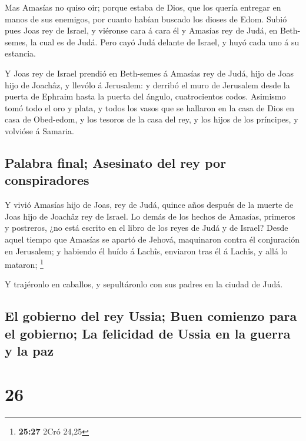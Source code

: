  Mas Amasías no quiso oir; porque estaba de Dios, que los
quería entregar en manos de sus enemigos, por cuanto habían buscado los
dioses de Edom.  Subió pues Joas rey de Israel, y viéronse
cara á cara él y Amasías rey de Judá, en Beth-semes, la cual es de Judá.
 Pero cayó Judá delante de Israel, y huyó cada uno á su
estancia.

 Y Joas rey de Israel prendió en Beth-semes á Amasías rey
de Judá, hijo de Joas hijo de Joachâz, y llevólo á Jerusalem: y derribó
el muro de Jerusalem desde la puerta de Ephraim hasta la puerta del
ángulo, cuatrocientos codos.  Asimismo tomó todo el oro y
plata, y todos los vasos que se hallaron en la casa de Dios en casa de
Obed-edom, y los tesoros de la casa del rey, y los hijos de los
príncipes, y volvióse á Samaria.

\hypertarget{palabra-final-asesinato-del-rey-por-conspiradores}{%
\subsection{Palabra final; Asesinato del rey por
conspiradores}\label{palabra-final-asesinato-del-rey-por-conspiradores}}

 Y vivió Amasías hijo de Joas, rey de Judá, quince años
después de la muerte de Joas hijo de Joachâz rey de Israel.
 Lo demás de los hechos de Amasías, primeros y postreros,
¿no está escrito en el libro de los reyes de Judá y de Israel?
 Desde aquel tiempo que Amasías se apartó de Jehová,
maquinaron contra él conjuración en Jerusalem; y habiendo él huído á
Lachîs, enviaron tras él á Lachîs, y allá lo mataron; \footnote{\textbf{25:27}
  2Cró 24,25}

 Y trajéronlo en caballos, y sepultáronlo con sus padres en
la ciudad de Judá.

\hypertarget{el-gobierno-del-rey-ussia-buen-comienzo-para-el-gobierno-la-felicidad-de-ussia-en-la-guerra-y-la-paz}{%
\subsection{El gobierno del rey Ussia; Buen comienzo para el gobierno;
La felicidad de Ussia en la guerra y la
paz}\label{el-gobierno-del-rey-ussia-buen-comienzo-para-el-gobierno-la-felicidad-de-ussia-en-la-guerra-y-la-paz}}

\hypertarget{section-25}{%
\section{26}\label{section-25}}

